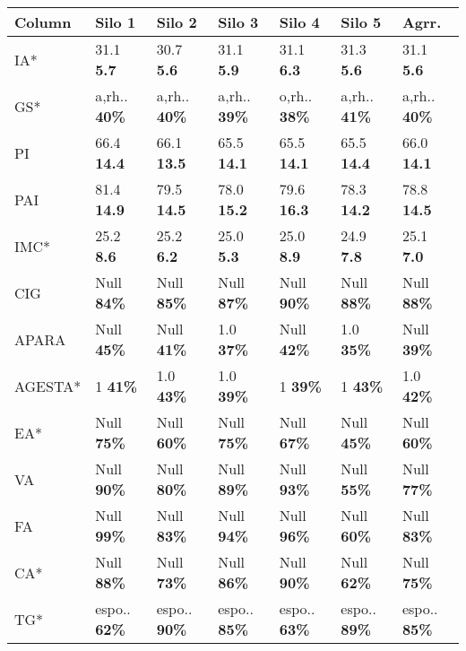 \begin{tabular}{l|llllll}
\toprule
   Column &               Silo 1 &               Silo 2 &               Silo 3 &               Silo 4 &               Silo 5 &                Agrr. \\
\midrule
       IA* &    31.1 \textbf{5.7} &    30.7 \textbf{5.6} &    31.1 \textbf{5.9} &    31.1 \textbf{6.3} &    31.3 \textbf{5.6} &    31.1 \textbf{5.6} \\
       GS* & a,rh.. \textbf{40\%} & a,rh.. \textbf{40\%} & a,rh.. \textbf{39\%} & o,rh.. \textbf{38\%} & a,rh.. \textbf{41\%} & a,rh.. \textbf{40\%} \\
       PI &   66.4 \textbf{14.4} &   66.1 \textbf{13.5} &   65.5 \textbf{14.1} &   65.5 \textbf{14.1} &   65.5 \textbf{14.4} &   66.0 \textbf{14.1} \\
      PAI &   81.4 \textbf{14.9} &   79.5 \textbf{14.5} &   78.0 \textbf{15.2} &   79.6 \textbf{16.3} &   78.3 \textbf{14.2} &   78.8 \textbf{14.5} \\
      IMC* &    25.2 \textbf{8.6} &    25.2 \textbf{6.2} &    25.0 \textbf{5.3} &    25.0 \textbf{8.9} &    24.9 \textbf{7.8} &    25.1 \textbf{7.0} \\
      CIG &   Null \textbf{84\%} &   Null \textbf{85\%} &   Null \textbf{87\%} &   Null \textbf{90\%} &   Null \textbf{88\%} &   Null \textbf{88\%} \\
    APARA &   Null \textbf{45\%} &   Null \textbf{41\%} &    1.0 \textbf{37\%} &   Null \textbf{42\%} &    1.0 \textbf{35\%} &   Null \textbf{39\%} \\
   AGESTA* &      1 \textbf{41\%} &    1.0 \textbf{43\%} &    1.0 \textbf{39\%} &      1 \textbf{39\%} &      1 \textbf{43\%} &    1.0 \textbf{42\%} \\
       EA* &   Null \textbf{75\%} &   Null \textbf{60\%} &   Null \textbf{75\%} &   Null \textbf{67\%} &   Null \textbf{45\%} &   Null \textbf{60\%} \\
       VA &   Null \textbf{90\%} &   Null \textbf{80\%} &   Null \textbf{89\%} &   Null \textbf{93\%} &   Null \textbf{55\%} &   Null \textbf{77\%} \\
       FA &   Null \textbf{99\%} &   Null \textbf{83\%} &   Null \textbf{94\%} &   Null \textbf{96\%} &   Null \textbf{60\%} &   Null \textbf{83\%} \\
       CA* &   Null \textbf{88\%} &   Null \textbf{73\%} &   Null \textbf{86\%} &   Null \textbf{90\%} &   Null \textbf{62\%} &   Null \textbf{75\%} \\
       TG* & espo.. \textbf{62\%} & espo.. \textbf{90\%} & espo.. \textbf{85\%} & espo.. \textbf{63\%} & espo.. \textbf{89\%} & espo.. \textbf{85\%} \\

\end{tabular}

